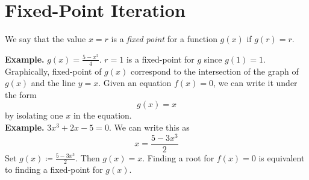 \documentclass[openany]{report}
\begin{document}
\section{Fixed-Point Iteration}
\begin{definition}
    We say that the value $x = r$ is a \emph{fixed point} for a function $g(x)$ if $g(r) = r$.
\end{definition}
\noindent
\textbf{Example.} $g(x) = \frac{5-x^2}{4}$. $r = 1$ is a fixed-point for $g$ since $g(1) = 1$.\\[2ex]
Graphically, fixed-point of $g(x)$ correspond to the intersection of the graph of $g(x)$ and the line $y = x$. Given an equation $f(x) = 0$, we can write it under the form 
\[g(x) = x\]
by isolating one $x$ in the equation.\\[2ex]
\textbf{Example.} $3x^3 + 2x - 5 = 0$. We can write this as 
\[x = \frac{5-3x^3}{2}\]
Set $g(x) \coloneqq \frac{5-3x^3}{2}$. Then $g(x) = x$. Finding a root for $f(x) = 0$ is equivalent to finding a fixed-point for $g(x)$.\\[2ex]
\end{document}
